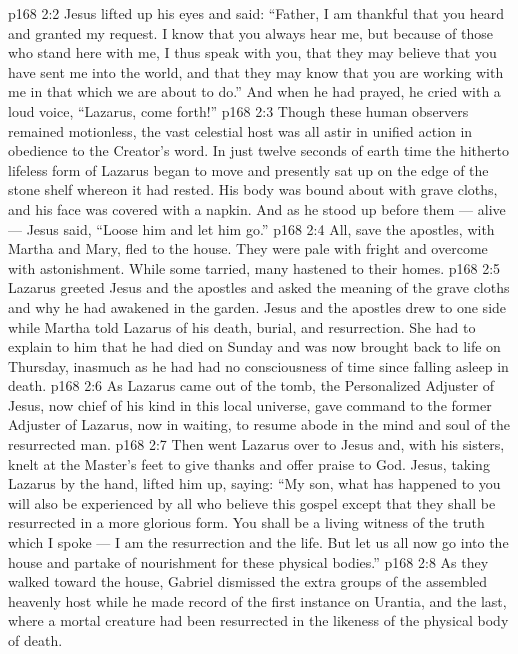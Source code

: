 \vs p168 2:2 Jesus lifted up his eyes and said: \textcolor{ubdarkred}{“Father, I am thankful that you heard and granted my request. I know that you always hear me, but because of those who stand here with me, I thus speak with you, that they may believe that you have sent me into the world, and that they may know that you are working with me in that which we are about to do.”} And when he had prayed, he cried with a loud voice, “Lazarus, come forth!”
\vs p168 2:3 Though these human observers remained motionless, the vast celestial host was all astir in unified action in obedience to the Creator’s word. In just twelve seconds of earth time the hitherto lifeless form of Lazarus began to move and presently sat up on the edge of the stone shelf whereon it had rested. His body was bound about with grave cloths, and his face was covered with a napkin. And as he stood up before them --- alive --- Jesus said, \textcolor{ubdarkred}{“Loose him and let him go.”}
\vs p168 2:4 All, save the apostles, with Martha and Mary, fled to the house. They were pale with fright and overcome with astonishment. While some tarried, many hastened to their homes.
\vs p168 2:5 Lazarus greeted Jesus and the apostles and asked the meaning of the grave cloths and why he had awakened in the garden. Jesus and the apostles drew to one side while Martha told Lazarus of his death, burial, and resurrection. She had to explain to him that he had died on Sunday and was now brought back to life on Thursday, inasmuch as he had had no consciousness of time since falling asleep in death.
\vs p168 2:6 \pc As Lazarus came out of the tomb, the Personalized Adjuster of Jesus, now chief of his kind in this local universe, gave command to the former Adjuster of Lazarus, now in waiting, to resume abode in the mind and soul of the resurrected man.
\vs p168 2:7 \pc Then went Lazarus over to Jesus and, with his sisters, knelt at the Master’s feet to give thanks and offer praise to God. Jesus, taking Lazarus by the hand, lifted him up, saying: \textcolor{ubdarkred}{“My son, what has happened to you will also be experienced by all who believe this gospel except that they shall be resurrected in a more glorious form. You shall be a living witness of the truth which I spoke --- I am the resurrection and the life. But let us all now go into the house and partake of nourishment for these physical bodies.”}
\vs p168 2:8 \pc As they walked toward the house, Gabriel dismissed the extra groups of the assembled heavenly host while he made record of the first instance on Urantia, and the last, where a mortal creature had been resurrected in the likeness of the physical body of death.
